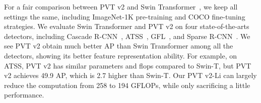 \documentclass[10pt,twocolumn,letterpaper]{article}
\begin{document}
	
	For a fair comparison between PVT v2 and Swin Transformer~\cite{swin}, we keep all settings the same, including ImageNet-1K pre-training and COCO fine-tuning strategies.
	We evaluate Swin Transformer and PVT v2 on four state-of-the-arts detectors, including Cascade R-CNN~\cite{cai2018cascade}, ATSS~\cite{zhang2020bridging}, GFL~\cite{li2020generalized}, and Sparse R-CNN~\cite{sun2020sparse}. We see PVT v2 obtain much better AP than Swin Transformer among all the detectors, showing its better feature representation ability.
	For example, on ATSS, PVT v2 has similar parameters and flops compared to Swin-T, but PVT v2 achieves 49.9 AP, which is 2.7 higher than Swin-T. Our PVT v2-Li can largely reduce the computation from 258 to 194 GFLOPs, while only sacrificing a little performance.
	
	\begin{table*}[t]
		\centering
		\setlength{\tabcolsep}{1.7mm}
		\footnotesize
		


\end{table*}
\end{document}
